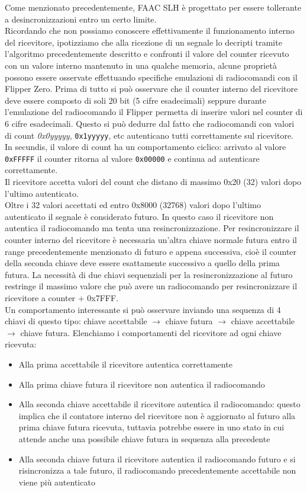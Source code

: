 Come menzionato precedentemente, FAAC SLH è progettato per essere tollerante a desincronizzazioni entro un certo limite.\\
Ricordando che non possiamo conoscere effettivamente il funzionamento interno del ricevitore, ipotizziamo che alla ricezione di un segnale lo decripti tramite l’algoritmo precedentemente descritto e confronti il valore del counter ricevuto con un valore interno mantenuto in una qualche memoria, alcune proprietà possono essere osservate effettuando specifiche emulazioni di radiocomandi con il Flipper Zero.
Prima di tutto si può osservare che il counter interno del ricevitore deve essere composto di soli 20 bit (5 cifre esadecimali) seppure durante l’emulazione del radiocomando il Flipper permetta di inserire valori nel counter di 6 cifre esadecimali. Questo si può dedurre dal fatto che radiocomandi con valori di count \textsl{0x0yyyyy}, \texttt{0x1yyyyy}, etc autenticano tutti correttamente sul ricevitore.\\
In secundis, il valore di count ha un comportamento ciclico: arrivato al valore \texttt{0xFFFFF} il counter ritorna al valore \texttt{0x00000} e continua ad autenticare correttamente.\\
Il ricevitore accetta valori del count che distano di massimo 0x20 (32) valori dopo l’ultimo autenticato.\\
Oltre i 32 valori accettati ed entro 0x8000 (32768) valori dopo l’ultimo autenticato il segnale è considerato futuro. In questo caso il ricevitore non autentica il radiocomando ma tenta una resincronizzazione. Per resincronizzare il counter interno del ricevitore è necessaria un’altra chiave normale futura entro il range precedentemente menzionato di futuro e appena successiva, cioè il counter della seconda chiave deve essere esattamente successivo a quello della prima futura. La necessità di due chiavi sequenziali per la resincronizzazione al futuro restringe il massimo valore che può avere un radiocomando per resincronizzare il ricevitore a counter + 0x7FFF.\\
Un comportamento interessante si può osservare inviando una sequenza di 4 chiavi di questo tipo: chiave accettabile \(\rightarrow\) chiave futura \(\rightarrow\) chiave accettabile \(\rightarrow\) chiave futura. Elenchiamo i comportamenti del ricevitore ad ogni chiave ricevuta:
\begin{itemize}
  \item Alla prima accettabile il ricevitore autentica correttamente
  \item Alla prima chiave futura il ricevitore non autentica il radiocomando
  \item Alla seconda chiave accettabile il ricevitore autentica il radiocomando: questo implica che il contatore interno del ricevitore non è aggiornato al futuro alla prima chiave futura ricevuta, tuttavia potrebbe essere in uno stato in cui attende anche una possibile chiave futura in sequenza alla precedente
  \item Alla seconda chiave futura il ricevitore autentica il radiocomando futuro e si risincronizza a tale futuro, il radiocomando precedentemente accettabile non viene più autenticato
\end{itemize}
